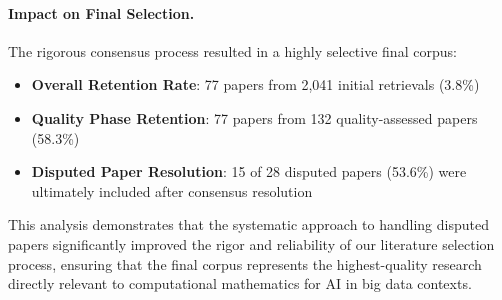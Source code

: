 \documentclass[acmsmall]{acmart}
\begin{document}

    
    

\paragraph{Impact on Final Selection.}

The rigorous consensus process resulted in a highly selective final corpus:

\begin{itemize}
    \item \textbf{Overall Retention Rate}: 77 papers from 2,041 initial retrievals (3.8\%)
    \item \textbf{Quality Phase Retention}: 77 papers from 132 quality-assessed papers (58.3\%)
    \item \textbf{Disputed Paper Resolution}: 15 of 28 disputed papers (53.6\%) were ultimately included after consensus resolution
\end{itemize}

This analysis demonstrates that the systematic approach to handling disputed papers significantly improved the rigor and reliability of our literature selection process, ensuring that the final corpus represents the highest-quality research directly relevant to computational mathematics for AI in big data contexts.
\end{document}
